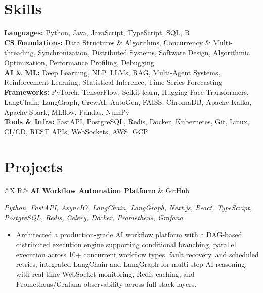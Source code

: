 \documentclass[a4paper,10pt]{article}
\newcommand{\ulink}[2]{\href{#1}{\uline{#2}}}
\newcommand{\subheading}[1]{{\color[HTML]{0A0A0A}\fontsize{12}{14}\selectfont\bfseries #1}}
\newcommand{\techstack}[1]{{\color[HTML]{5C5C5C}\fontsize{10.5}{12.5}\selectfont\itshape #1}}
\newcommand{\meta}[1]{{\color[HTML]{5C5C5C}\fontsize{10.5}{12.5}\selectfont #1}}
\begin{document}
\section{Skills}
\vspace{2pt}
{\color[HTML]{0A0A0A}\fontsize{11}{14}\selectfont
\textbf{Languages:} Python, Java, JavaScript, TypeScript, SQL, R \\[2pt]
\textbf{CS Foundations:} Data Structures \& Algorithms, Concurrency \& Multi-threading, Synchronization, Distributed Systems, Software Design, Algorithmic Optimization, Performance Profiling, Debugging \\[2pt]
\textbf{AI \& ML:} Deep Learning, NLP, LLMs, RAG, Multi-Agent Systems, Reinforcement Learning, Statistical Inference, Time-Series Forecasting \\[2pt]
\textbf{Frameworks:} PyTorch, TensorFlow, Scikit-learn, Hugging Face Transformers, LangChain, LangGraph, CrewAI, AutoGen, FAISS, ChromaDB, Apache Kafka, Apache Spark, MLflow, Pandas, NumPy \\[2pt]
\textbf{Tools \& Infra:} FastAPI, PostgreSQL, Redis, Docker, Kubernetes, Git, Linux, CI/CD, REST APIs, WebSockets, AWS, GCP
}

\vspace{2pt}

\section{Projects}
\vspace{2pt}

\begin{tabularx}{\linewidth}{@{}X R@{}}
  \subheading{AI Workflow Automation Platform} &
  \meta{\ulink{https://github.com/su-jin1425/AI-Workflow-Automation-Platform}{GitHub}}
\end{tabularx}
\vspace{1pt}
\techstack{Python, FastAPI, AsyncIO, LangChain, LangGraph, Next.js, React, TypeScript, PostgreSQL, Redis, Celery, Docker, Prometheus, Grafana}
\begin{itemize}[nosep, leftmargin=1.5em, itemsep=1pt, topsep=2pt]
  \item {\color[HTML]{0A0A0A}\fontsize{11}{14}\selectfont Architected a production-grade AI workflow platform with a DAG-based distributed execution engine supporting conditional branching, parallel execution across 10+ concurrent workflow types, fault recovery, and scheduled retries; integrated LangChain and LangGraph for multi-step AI reasoning, with real-time WebSocket monitoring, Redis caching, and Prometheus/Grafana observability across full-stack layers.}
\end{itemize}
\end{document}
